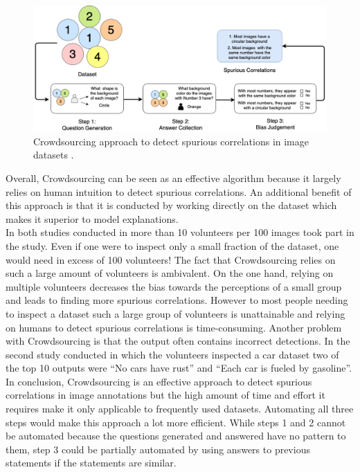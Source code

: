 \documentclass{article}
\begin{document}
\begin{figure}
    \centering
    \includegraphics[scale=0.315]{crowdsourcing.png}
    \caption{Crowdsourcing approach to detect spurious correlations in image datasets \cite{10.1145/3366423.3380063}.}
    \label{fig:crowdsourcing}
\end{figure}

Overall, Crowdsourcing can be seen as an effective algorithm because it largely relies on human intuition to detect
spurious correlations. An additional benefit of this approach is that it is conducted by working directly
on the dataset which makes it superior to model explanations. \\
In both studies conducted in \cite{10.1145/3366423.3380063} more than 10 volunteers per 100 images took part in the study.
Even if one were to inspect only a small fraction of the dataset, one would need in excess of 100 volunteers!
The fact that Crowdsourcing relies on such a large amount of volunteers is ambivalent. On the one hand, relying on multiple
volunteers decreases the bias towards the perceptions of a small group and leads to finding more spurious correlations.
However to most people needing to inspect a dataset such a large group of volunteers is unattainable and relying on humans
to detect spurious correlations is time-consuming.
Another problem with Crowdsourcing is that the output often contains incorrect detections.
In the second study conducted in which the volunteers inspected a car dataset two of the top 10 outputs
were \enquote{No cars have rust} and \enquote{Each car is fueled by gasoline}. \\
In conclusion, Crowdsourcing is an effective approach to detect spurious correlations in image annotations
but the high amount of time and effort it requires make it only applicable to frequently used datasets. 
Automating all three steps would make this approach a lot more efficient. While steps 1 and 2 cannot be automated because the
questions generated and answered have no pattern to them, step 3 could be partially automated by using answers to previous
statements if the statements are similar.
\end{document}
